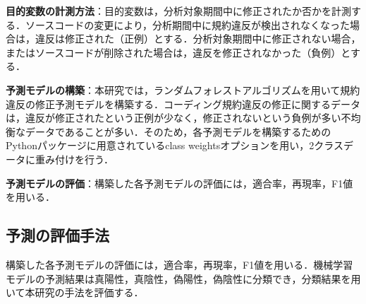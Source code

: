 \documentclass[uplatex,dvipdfmx,a4paper,twocolumn,base=10.5pt,jbase=10.5pt,ja=standard]{bxjsarticle}  %
\begin{document}
\noindent\textbf{目的変数の計測方法}：目的変数は，分析対象期間中に修正されたか否かを計測する．ソースコードの変更により，分析期間中に規約違反が検出されなくなった場合は，違反は修正された（正例）とする．分析対象期間中に修正されない場合，またはソースコードが削除された場合は，違反を修正されなかった（負例）とする．

\noindent\textbf{予測モデルの構築}：本研究では，ランダムフォレストアルゴリズムを用いて規約違反の修正予測モデルを構築する．コーディング規約違反の修正に関するデータは，違反が修正されたという正例が少なく，修正されないという負例が多い不均衡なデータであることが多い．そのため，各予測モデルを構築するためのPythonパッケージに用意されているclass weightsオプションを用い，2クラスデータに重み付けを行う．

\noindent\textbf{予測モデルの評価}：構築した各予測モデルの評価には，適合率，再現率，F1値を用いる．
\vspace{2mm}
\subsection{予測の評価手法}
\vspace{2mm}
構築した各予測モデルの評価には，適合率，再現率，F1値を用いる．機械学習モデルの予測結果は真陽性，真陰性，偽陽性，偽陰性に分類でき，分類結果を用いて本研究の手法を評価する．

\end{document}
